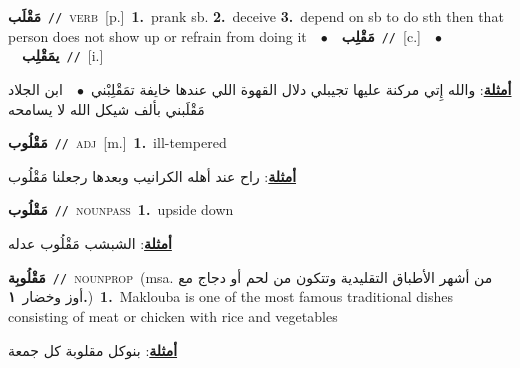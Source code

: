 \documentclass[10pt,a4paper,twoside]{article} %
\begin{document}
\begin{multicols}{2}
{\setlength\topsep{0pt}\textbf{\foreignlanguage{arabic}{مَقْلَب}}\ {\color{gray}\texttt{//}\color{black}}\ \textsc{verb}\ [p.]\ \textbf{1.}~prank sb.  \textbf{2.}~deceive  \textbf{3.}~depend on sb to do sth then that person does not show up or refrain from doing it\ \ $\bullet$\ \ \setlength\topsep{0pt}\textbf{\foreignlanguage{arabic}{مَقْلِب}}\ {\color{gray}\texttt{//}\color{black}}\ [c.]\ \ $\bullet$\ \ \setlength\topsep{0pt}\textbf{\foreignlanguage{arabic}{يمَقْلِب}}\ {\color{gray}\texttt{//}\color{black}}\ [i.]\  \begin{flushright}\color{gray}\foreignlanguage{arabic}{\textbf{\underline{\foreignlanguage{arabic}{أمثلة}}}: والله إِتي مركنة عليها تجيبلي دلال القهوة اللي عندها خايفة تمَقْلِبْني\ $\bullet$\ \  ابن الجلاد مَقْلَبني بألف شيكل الله لا يسامحه}\end{flushright}\color{black}} \vspace{2mm}

{\setlength\topsep{0pt}\textbf{\foreignlanguage{arabic}{مَقْلُوب}}\ {\color{gray}\texttt{//}\color{black}}\ \textsc{adj}\ [m.]\ \textbf{1.}~ill-tempered\  \begin{flushright}\color{gray}\foreignlanguage{arabic}{\textbf{\underline{\foreignlanguage{arabic}{أمثلة}}}: راح عند أهله الكرانيب وبعدها رجعلنا مَقْلُوب}\end{flushright}\color{black}} \vspace{2mm}

{\setlength\topsep{0pt}\textbf{\foreignlanguage{arabic}{مَقْلُوب}}\ {\color{gray}\texttt{//}\color{black}}\ \textsc{noun\textunderscore pass}\ \textbf{1.}~upside down\  \begin{flushright}\color{gray}\foreignlanguage{arabic}{\textbf{\underline{\foreignlanguage{arabic}{أمثلة}}}: الشبشب مَقْلُوب عدله}\end{flushright}\color{black}} \vspace{2mm}

{\setlength\topsep{0pt}\textbf{\foreignlanguage{arabic}{مَقْلُوبِة}}\ {\color{gray}\texttt{//}\color{black}}\ \textsc{noun\textunderscore prop}\ \color{gray}(msa. \foreignlanguage{arabic}{من أشهر الأطباق التقليدية وتتكون من لحم أو دجاج مع أوز وخضار}~\foreignlanguage{arabic}{\textbf{١.}})\color{black}\ \textbf{1.}~Maklouba is one of the most famous traditional dishes consisting of meat or chicken with rice and vegetables\  \begin{flushright}\color{gray}\foreignlanguage{arabic}{\textbf{\underline{\foreignlanguage{arabic}{أمثلة}}}: بنوكل مقلوبة كل جمعة}\end{flushright}\color{black}} \vspace{2mm}


\end{multicols}
\end{document}
